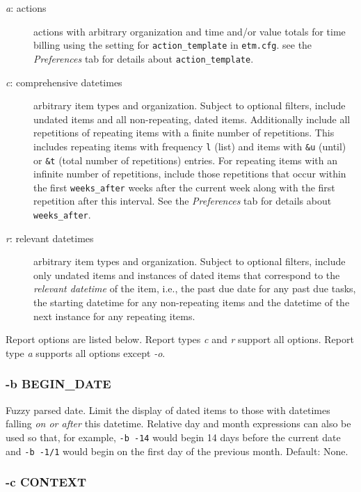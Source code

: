 \documentclass[]{article}
\begin{document}
\begin{description}
\item[\emph{a}: actions]
actions with arbitrary organization and time and/or value totals for
time billing using the setting for \texttt{action\_template} in
\texttt{etm.cfg}. see the \emph{Preferences} tab for details about
\texttt{action\_template}.
\item[\emph{c}: comprehensive datetimes]
arbitrary item types and organization. Subject to optional filters,
include undated items and all non-repeating, dated items. Additionally
include all repetitions of repeating items with a finite number of
repetitions. This includes repeating items with frequency \texttt{l}
(list) and items with \texttt{\&u} (until) or \texttt{\&t} (total number
of repetitions) entries. For repeating items with an infinite number of
repetitions, include those repetitions that occur within the first
\texttt{weeks\_after} weeks after the current week along with the first
repetition after this interval. See the \emph{Preferences} tab for
details about \texttt{weeks\_after}.
\item[\emph{r}: relevant datetimes]
arbitrary item types and organization. Subject to optional filters,
include only undated items and instances of dated items that correspond
to the \emph{relevant datetime} of the item, i.e., the past due date for
any past due tasks, the starting datetime for any non-repeating items
and the datetime of the next instance for any repeating items.
\end{description}

Report options are listed below. Report types \emph{c} and \emph{r}
support all options. Report type \emph{a} supports all options except
\emph{-o}.

\subsubsection{-b BEGIN\_DATE}

Fuzzy parsed date. Limit the display of dated items to those with
datetimes falling \emph{on or after} this datetime. Relative day and
month expressions can also be used so that, for example, \texttt{-b -14}
would begin 14 days before the current date and \texttt{-b -1/1} would
begin on the first day of the previous month. Default: None.

\subsubsection{-c CONTEXT}
\end{document}
